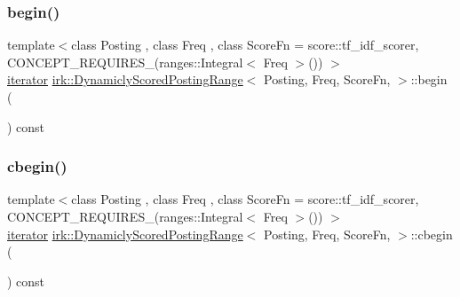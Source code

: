 \subsubsection{\texorpdfstring{begin()}{begin()}}
{\footnotesize\ttfamily template$<$class Posting , class Freq , class Score\+Fn  = score\+::tf\+\_\+idf\+\_\+scorer, C\+O\+N\+C\+E\+P\+T\+\_\+\+R\+E\+Q\+U\+I\+R\+E\+S\+\_\+(ranges\+::\+Integral$<$ Freq $>$()) $>$ \\
\mbox{\hyperlink{classirk_1_1DynamiclyScoredPostingRange_1_1iterator}{iterator}} \mbox{\hyperlink{classirk_1_1DynamiclyScoredPostingRange}{irk\+::\+Dynamicly\+Scored\+Posting\+Range}}$<$ Posting, Freq, Score\+Fn, $>$\+::begin (\begin{DoxyParamCaption}{ }\end{DoxyParamCaption}) const\hspace{0.3cm}{\ttfamily [inline]}}

\mbox{\label{classirk_1_1DynamiclyScoredPostingRange_a130e87da0cf848b265a5b3a02757a912}} 
\subsubsection{\texorpdfstring{cbegin()}{cbegin()}}
{\footnotesize\ttfamily template$<$class Posting , class Freq , class Score\+Fn  = score\+::tf\+\_\+idf\+\_\+scorer, C\+O\+N\+C\+E\+P\+T\+\_\+\+R\+E\+Q\+U\+I\+R\+E\+S\+\_\+(ranges\+::\+Integral$<$ Freq $>$()) $>$ \\
\mbox{\hyperlink{classirk_1_1DynamiclyScoredPostingRange_1_1iterator}{iterator}} \mbox{\hyperlink{classirk_1_1DynamiclyScoredPostingRange}{irk\+::\+Dynamicly\+Scored\+Posting\+Range}}$<$ Posting, Freq, Score\+Fn, $>$\+::cbegin (\begin{DoxyParamCaption}{ }\end{DoxyParamCaption}) const\hspace{0.3cm}{\ttfamily [inline]}}

\mbox{\label{classirk_1_1DynamiclyScoredPostingRange_ad089ed399066946c119434893ba6f5c3}} 

